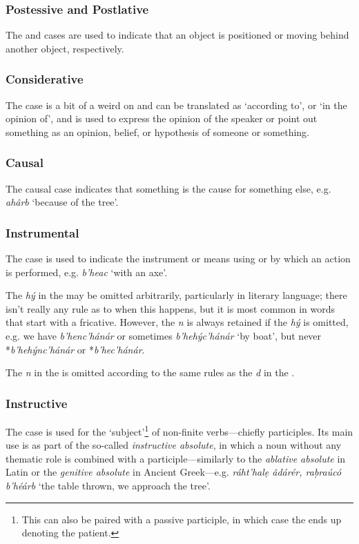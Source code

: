 \documentclass[a4paper, 12pt, twoside, final]{article}
\let \w \textit
\begin{document}
\subsubsection{Postessive and Postlative}
The  and  cases are used to indicate that an object is positioned or moving behind another object,
respectively.


\subsubsection{Considerative}
The  case is a bit of a weird on and can be translated as ‘according to’, or ‘in the opinion of’, and is used to
express the opinion of the speaker or point out something as an opinion, belief, or hypothesis of someone or something.

\subsubsection{Causal}
The causal case indicates that something is the cause for something else, e.g. \w{ahârb} ‘because of the tree’.

\subsubsection{Instrumental}
The  case is used to indicate the instrument or means using or by which an action is performed, e.g. \w{b’heac}
‘with an axe’.

The \w{hý} in the  may be omitted arbitrarily, particularly in literary language; there
isn’t really any rule as to when this happens, but it is most common in words that start with a fricative. However, the \w{n}
is always retained if the \w{hý} is omitted, e.g. we have \w{b’henc’hánár} or sometimes \w{b’hehýc’hánár} ‘by boat’, but never
*\w{b’hehýnc’hánár} or *\w{b’hec’hánár}.

The \w{n} in the  is omitted according to the same rules as the \w{d} in the .

\subsubsection{Instructive}
The  case is used for the ‘subject’\footnote{This can also be paired with a passive participle, in which case the
 ends up denoting the patient.} of non-finite verbs—chiefly participles. Its main use is as part of the so-called \textit{instructive
absolute}, in which a noun without any thematic role is combined with a participle—similarly to the \textit{ablative absolute} in
Latin or the \textit{genitive absolute} in Ancient Greek—e.g. \w{ráht’halẹ âdárér, raḅraúcó b’héárb} ‘the table thrown, we approach the
tree’.
\end{document}
